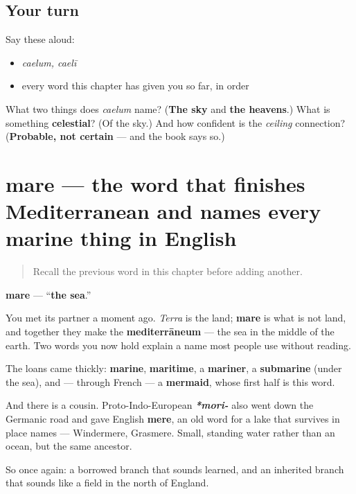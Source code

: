 \subsection*{Your turn}
Say these aloud:

\begin{itemize}
\raggedright
  \item \emph{caelum, caelī}
  \item every word this chapter has given you so far, in order
\end{itemize}

\begin{tcolorbox}[breakable,colback=teal!4,colframe=teal!35!black,title={Before you move on}]
What two things does \emph{caelum} name? (\textbf{The sky} and \textbf{the heavens}.) What is something \textbf{celestial}? (Of the sky.) And how confident is the \emph{ceiling} connection? (\textbf{Probable, not certain} — and the book says so.)
\end{tcolorbox}
\section[mare, maris]{mare — the word that finishes Mediterranean and names every marine thing in English}

\label{lesson:LA-C45-mare}



\begin{quote}
Recall the previous word in this chapter before adding another.
\end{quote}

\begin{cousinweb}
\textbf{mare} — \textquotedblleft{}\textbf{the sea}.\textquotedblright{}

You met its partner a moment ago. \emph{Terra} is the land; \textbf{mare} is what is not land, and together they make the \textbf{mediterrāneum} — the sea in the middle of the earth. Two words you now hold explain a name most people use without reading.

The loans came thickly: \textbf{marine}, \textbf{maritime}, a \textbf{mariner}, a \textbf{submarine} (under the sea), and — through French — a \textbf{mermaid}, whose first half is this word.

And there is a cousin. Proto-Indo-European \emph{\textbf{*mori-}} also went down the Germanic road and gave English \textbf{mere}, an old word for a lake that survives in place names — Windermere, Grasmere. Small, standing water rather than an ocean, but the same ancestor.

So once again: a borrowed branch that sounds learned, and an inherited branch that sounds like a field in the north of England.
\end{cousinweb}

